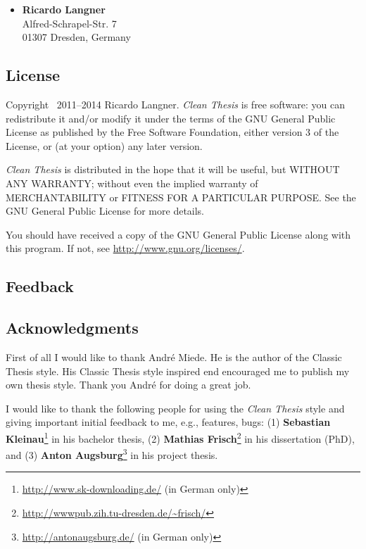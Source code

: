 \documentclass{ltxdockit}
\newcommand*{\cleanthesis}{\emph{Clean Thesis}\xspace}
\begin{document}
\begin{itemize}
\item \textbf{Ricardo Langner} \\
Alfred-Schrapel-Str. 7 \\
01307 Dresden, Germany
\end{itemize}

\subsection{License}
\label{sec:intro:license}

Copyright \textcopyright\ 2011--2014 Ricardo Langner.
\cleanthesis is free software: you can redistribute it and/or modify it under the terms of the GNU General Public License as published by the Free Software Foundation, either version 3 of the License, or (at your option) any later version.

\cleanthesis is distributed in the hope that it will be useful, but WITHOUT ANY WARRANTY; without even the implied warranty of MERCHANTABILITY or FITNESS FOR A PARTICULAR PURPOSE.
See the GNU General Public License for more details.

You should have received a copy of the GNU General Public License along with this program.
If not, see \url{http://www.gnu.org/licenses/}.

\subsection{Feedback}
\label{sec:intro:feedback}

\subsection{Acknowledgments}
\label{sec:intro:ack}

First of all I would like to thank André Miede. He is the author of the Classic Thesis style. His Classic Thesis style inspired end encouraged me to publish my own thesis style. Thank you André for doing a great job.

I would like to thank the following people for using the \cleanthesis style and giving important initial feedback to me, e.g., features, bugs: (1) \textbf{Sebastian Kleinau}\footnote{\url{http://www.sk-downloading.de/} (in German only)} in his bachelor thesis, (2) \textbf{Mathias Frisch}\footnote{\url{http://wwwpub.zih.tu-dresden.de/~frisch/}} in his dissertation (PhD), and (3) \textbf{Anton Augsburg}\footnote{\url{http://antonaugsburg.de/} (in German only)} in his project thesis.
\end{document}
